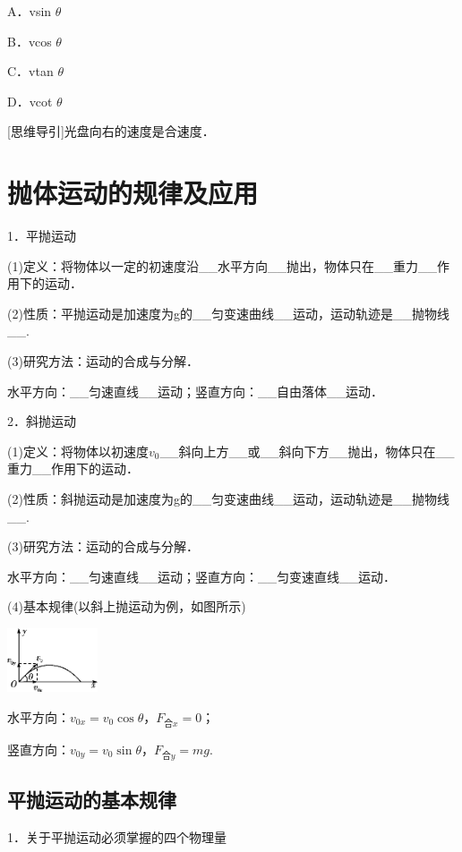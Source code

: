 A．vsin $\theta$ 

B．vcos $\theta$

C．vtan $\theta$ 

D．vcot $\theta$

{[}思维导引{]}光盘向右的速度是合速度．


\newpage
\section{抛体运动的规律及应用}


1．平抛运动

(1)定义：将物体以一定的初速度沿\_\_水平方向\_\_抛出，物体只在\_\_重力\_\_作用下的运动．

(2)性质：平抛运动是加速度为g的\_\_匀变速曲线\_\_运动，运动轨迹是\_\_抛物线\_\_.

(3)研究方法：运动的合成与分解．

水平方向：\_\_匀速直线\_\_运动；竖直方向：\_\_自由落体\_\_运动．

2．斜抛运动

(1)定义：将物体以初速度$v_0$\_\_斜向上方\_\_或\_\_斜向下方\_\_抛出，物体只在\_\_重力\_\_作用下的运动．

(2)性质：斜抛运动是加速度为g的\_\_匀变速曲线\_\_运动，运动轨迹是\_\_抛物线\_\_.

(3)研究方法：运动的合成与分解．

水平方向：\_\_匀速直线\_\_运动；竖直方向：\_\_匀变速直线\_\_运动．

(4)基本规律(以斜上抛运动为例，如图所示)

\begin{center}\includegraphics[width=1.05208in,height=0.73958in]{media/image160.png}\end{center}

水平方向：$v_{0x}=v_0\cos\theta$，$F_{\text{合}x}=0$；

竖直方向：$v_{0y}=v_0\sin\theta$，$F_{\text{合}y}=mg$.

\newpage
\subsection{平抛运动的基本规律}

1．关于平抛运动必须掌握的四个物理量

